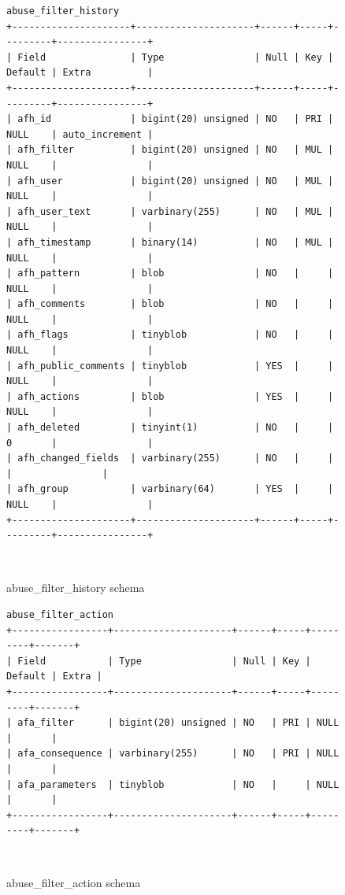 \documentclass{sigchi}
\begin{document}
\begin{figure}
\begin{verbatim}
abuse_filter_history
+---------------------+---------------------+------+-----+---------+----------------+
| Field               | Type                | Null | Key | Default | Extra          |
+---------------------+---------------------+------+-----+---------+----------------+
| afh_id              | bigint(20) unsigned | NO   | PRI | NULL    | auto_increment |
| afh_filter          | bigint(20) unsigned | NO   | MUL | NULL    |                |
| afh_user            | bigint(20) unsigned | NO   | MUL | NULL    |                |
| afh_user_text       | varbinary(255)      | NO   | MUL | NULL    |                |
| afh_timestamp       | binary(14)          | NO   | MUL | NULL    |                |
| afh_pattern         | blob                | NO   |     | NULL    |                |
| afh_comments        | blob                | NO   |     | NULL    |                |
| afh_flags           | tinyblob            | NO   |     | NULL    |                |
| afh_public_comments | tinyblob            | YES  |     | NULL    |                |
| afh_actions         | blob                | YES  |     | NULL    |                |
| afh_deleted         | tinyint(1)          | NO   |     | 0       |                |
| afh_changed_fields  | varbinary(255)      | NO   |     |         |                |
| afh_group           | varbinary(64)       | YES  |     | NULL    |                |
+---------------------+---------------------+------+-----+---------+----------------+
\end{verbatim}
  \caption{abuse\_filter\_history schema}~\label{fig:db-schemas-afh}
\end{figure}

\begin{figure}
\begin{verbatim}
abuse_filter_action
+-----------------+---------------------+------+-----+---------+-------+
| Field           | Type                | Null | Key | Default | Extra |
+-----------------+---------------------+------+-----+---------+-------+
| afa_filter      | bigint(20) unsigned | NO   | PRI | NULL    |       |
| afa_consequence | varbinary(255)      | NO   | PRI | NULL    |       |
| afa_parameters  | tinyblob            | NO   |     | NULL    |       |
+-----------------+---------------------+------+-----+---------+-------+
\end{verbatim}
  \caption{abuse\_filter\_action schema}~\label{fig:db-schemas-afa}
\end{figure}
\end{document}
